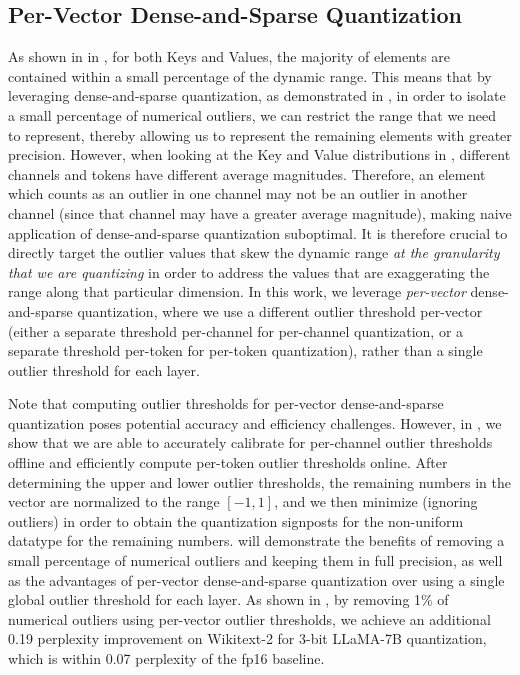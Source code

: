 \subsection{Per-Vector Dense-and-Sparse Quantization}
\label{sec:method-outlier}

As shown in  in , for both Keys and Values, the majority of elements are contained within a small percentage of the dynamic range. This means that by leveraging dense-and-sparse quantization, as demonstrated in \cite{kim2023squeezellm}, in order to isolate a small percentage of numerical outliers, we can restrict the range that we need to represent, thereby allowing us to represent the remaining elements with greater precision. However, when looking at the Key and Value distributions in , different channels and tokens have different average magnitudes. Therefore, an element which counts as an outlier in one channel may not be an outlier in another channel (since that channel may have a greater average magnitude), making naive application of dense-and-sparse quantization suboptimal. It is therefore crucial to directly target the outlier values that skew the dynamic range \textit{at the granularity that we are quantizing} in order to address the values that are exaggerating the range along that particular dimension. In this work, we leverage \textit{per-vector} dense-and-sparse quantization, where we use a different outlier threshold per-vector (either a separate threshold per-channel for per-channel quantization, or a separate threshold per-token for per-token quantization), rather than a single outlier threshold for each layer.

Note that computing outlier thresholds for per-vector dense-and-sparse quantization poses potential accuracy and efficiency challenges. However, in , we show that we are able to accurately calibrate for per-channel outlier thresholds offline and efficiently compute per-token outlier thresholds online. After determining the upper and lower outlier thresholds, the remaining numbers in the vector are normalized to the range $[-1,1]$, and we then minimize  (ignoring outliers) in order to obtain the quantization signposts for the non-uniform datatype for the remaining numbers.
 will demonstrate the benefits of removing a small percentage of numerical outliers and keeping them in full precision, as well as the advantages of per-vector dense-and-sparse quantization over using a single global outlier threshold for each layer. As shown in , by removing 1\% of numerical outliers using per-vector outlier thresholds, we achieve an additional 0.19 perplexity improvement on Wikitext-2 for 3-bit LLaMA-7B quantization, which is within 0.07 perplexity of the fp16 baseline. 

